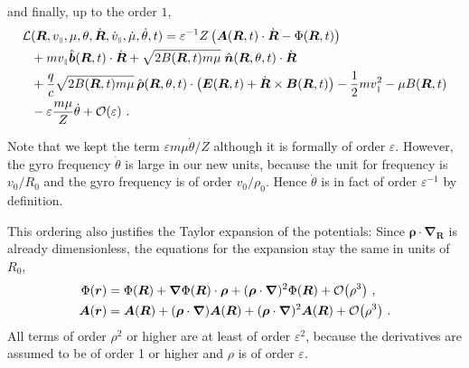 \documentclass{scrartcl}
\renewcommand{\vec}[1]{\boldsymbol{#1}}
\newcommand{\uv}[1]{\hat{\vec{#1}}}
\newcommand{\bnabla}{\vec{\nabla}}
\newcommand{\rv}{\vec{r}}
\newcommand{\rvgc}{\vec{R}} %
\newcommand{\PSL}{\mathcal{L}}
\newcommand{\subparallel}{{\scriptscriptstyle\parallel}}
\begin{document}
and finally, up to the order $1$,
\begin{align}
\PSL&(\rvgc,v_\subparallel,\mu,\theta,\dot{\rvgc},\dot{v}_\subparallel,\dot{\mu},\dot{\theta},t)  = \varepsilon^{-1}Z\left(\vec{A}(\rvgc,t)\cdot\dot{\rvgc} - \Phi(\rvgc,t)\right) \nonumber\\
& + mv_\subparallel \uv{b}(\rvgc,t)\cdot\dot{\rvgc} + \sqrt{2B(\rvgc,t)m\mu}\;\uv{n}(\rvgc,\theta,t)\cdot\dot{\rvgc}  \nonumber\\
& + \frac{q}{c}\sqrt{2B(\rvgc,t)m\mu}\,\uv{\rho}(\rvgc,\theta,t)\cdot\left(\vec{E}(\rvgc,t) + \dot{\rvgc}\times\vec{B}(\rvgc,t)\right) - \frac12mv_\subparallel^2 - \mu B(\rvgc,t) \nonumber\\
& - \varepsilon \frac{m\mu}{Z}\dot{\theta} +\order{\varepsilon}  \ . \label{eq:psl_newcoords_dimless_ordered_upto1}
\end{align}

Note that we kept the term $\varepsilon m\mu\dot{\theta}/Z$ although it is formally of order $\varepsilon$. However, the gyro frequency $\dot{\theta}$ is large in our new units, because the unit for frequency is $v_0/R_0$ and the gyro frequency is of order $v_0/\rho_0$. Hence $\dot{\theta}$ is in fact of order $\varepsilon^{-1}$ by definition.


This ordering also justifies the Taylor expansion of the potentials: Since $\vec{\rho}\cdot\bnabla_{\rvgc}$ is already dimensionless, the equations for the expansion stay the same in units of $R_0$,
\begin{align*}
\Phi(\rv) &= \Phi(\rvgc) + \bnabla\Phi(\rvgc)\cdot\vec{\rho} + (\vec{\rho}\cdot\bnabla)^2\Phi(\rvgc) + \order{\rho^3} \ , \\
\vec{A}(\rv) &= \vec{A}(\rvgc) + (\vec{\rho}\cdot\bnabla)\vec{A}(\rvgc) + (\vec{\rho}\cdot\bnabla)^2\vec{A}(\rvgc) + \order{\rho^3} \ .
\end{align*}
All terms of order $\rho^2$ or higher are at least of order $\varepsilon^2$, because the derivatives are assumed to be of order 1 or higher and $\rho$ is of order $\varepsilon$.
\end{document}
